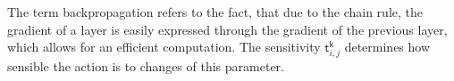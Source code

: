 The term backpropagation refers to the fact, that due to the chain rule, the gradient of a layer is easily expressed through the gradient of the previous layer, which allows for an efficient computation. The sensitivity $\mathsf{t}^\mathsf{k}_{i,j}$ determines how sensible the action is to changes of this parameter. \cite[p.11-7 - 11-13]{demuth_neural_2014}

